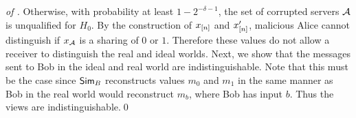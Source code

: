 \begin{proof}[of ]
	Otherwise, with probability at least $1 - 2^{-\delta-1}$, the set of corrupted servers ${\mathcal A}$ is unqualified for $H_0$.
	By the construction of $x_{[n]}$ and $x'_{[n]}$, malicious Alice cannot distinguish if $x_{\mathcal A}$ is a sharing of $0$ or $1$.
	Therefore these values do not allow a receiver to distinguish the real and ideal worlds.
	Next, we show that the messages sent to Bob in the ideal and real world are indistinguishable.
	Note that this must be the case since $\mathsf{Sim}_B$ reconstructs values $m_0$ and $m_1$ in the same manner as Bob in the real world would reconstruct $m_b$, where Bob has input $b$.
	Thus the views are indistinguishable.\qed
\end{proof}





